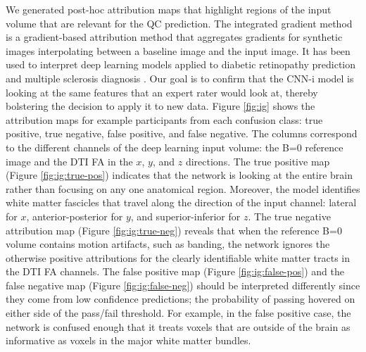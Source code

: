 \documentclass[fleqn,10pt]{wlscirep}
\begin{document}
We generated post-hoc attribution maps that highlight regions of the input
volume that are relevant for the QC prediction. The integrated gradient method
\cite{sundararajan2017axiomatic} is a gradient-based attribution method
\cite{ancona2019gradient} that aggregates gradients for synthetic images
interpolating between a baseline image and the input image. It has been used to
interpret deep learning models applied to diabetic retinopathy prediction
\cite{sayres2019using} and multiple sclerosis diagnosis
\cite{wargnier-dauchelle2021interpretable}. Our goal is to confirm that the
CNN-i model is looking at the same features that an expert rater would look at,
thereby bolstering the decision to apply it to new data. Figure \ref{fig:ig}
shows the attribution maps for example participants from each confusion class:
true positive, true negative, false positive, and false negative. The columns
correspond to the different channels of the deep learning input volume: the B=0
reference image and the DTI FA in the $x$, $y$, and $z$ directions.  The true
positive map (Figure \ref{fig:ig:true-pos}) indicates that the network is
looking at the entire brain rather than focusing on any one anatomical region.
Moreover, the model identifies white matter fascicles that travel along the
direction of the input channel: lateral for $x$, anterior-posterior for $y$, and
superior-inferior for $z$.
The true negative attribution map (Figure \ref{fig:ig:true-neg}) reveals that
when the reference B=0 volume contains motion artifacts, such as banding, the
network ignores the otherwise positive attributions for the clearly identifiable
white matter tracts in the DTI FA channels.
The false positive map (Figure \ref{fig:ig:false-pos}) and the false negative
map (Figure \ref{fig:ig:false-neg}) should be interpreted differently since they
come from low confidence predictions; the probability of passing hovered on
either side of the pass/fail threshold. For example, in the false positive case,
the network is confused enough that it treats voxels that are outside of the
brain as informative as voxels in the major white matter bundles.
\end{document}
